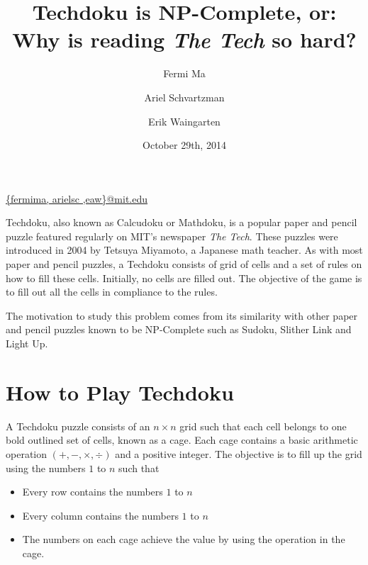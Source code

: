 \documentclass[runningheads,a4paper]{llncs}
\date{October 29th, 2014}							%
\begin{document}
\title{Techdoku is NP-Complete, or: Why is reading \textit{The Tech} so hard?}

\author{Fermi Ma \and Ariel Schvartzman \and Erik Waingarten}
%

\protect\url{{fermima, arielsc ,eaw}@mit.edu}

\maketitle

Techdoku, also known as Calcudoku or Mathdoku, is a popular paper and pencil puzzle featured regularly on MIT's newspaper \textit{The Tech}. These puzzles were introduced in 2004 by Tetsuya Miyamoto, a Japanese math teacher. As with most paper and pencil puzzles, a Techdoku consists of grid of cells and a set of rules on how to fill these cells. Initially, no cells are filled out. The objective of the game is to fill out all the cells in compliance to the rules. 

The motivation to study this problem comes from its similarity with other paper and pencil puzzles known to be NP-Complete such as Sudoku, Slither Link and Light Up. 

\section{How to Play Techdoku}

A Techdoku puzzle consists of an $n \times n$ grid such that each cell belongs to one bold outlined set of cells, known as a cage. Each cage contains a basic arithmetic operation $(+, - , \times, \div )$ and a positive integer. The objective is to fill up the grid using the numbers $1$ to $n$ such that 

\begin{itemize}
	\item Every row contains the numbers $1$ to $n$
	\item Every column contains the numbers $1$ to $n$
	\item The numbers on each cage achieve the value by using the operation in the cage. 
\end{itemize}
\end{document}
